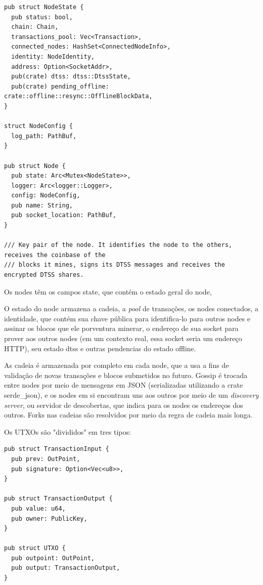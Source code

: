 \documentclass[
  12pt,
  a4paper,
  oneside,
  article,
]{abntex2}
\begin{document}

\begin{verbatim}
pub struct NodeState {
  pub status: bool,
  chain: Chain,
  transactions_pool: Vec<Transaction>,
  connected_nodes: HashSet<ConnectedNodeInfo>,
  identity: NodeIdentity,
  address: Option<SocketAddr>,
  pub(crate) dtss: dtss::DtssState,
  pub(crate) pending_offline: crate::offline::resync::OfflineBlockData,
}

struct NodeConfig {
  log_path: PathBuf,
}

pub struct Node {
  pub state: Arc<Mutex<NodeState>>,
  logger: Arc<logger::Logger>,
  config: NodeConfig,
  pub name: String,
  pub socket_location: PathBuf,
}

/// Key pair of the node. It identifies the node to the others, receives the coinbase of the
/// blocks it mines, signs its DTSS messages and receives the encrypted DTSS shares.
\end{verbatim}

Os nodes têm os campos state, que contém o estado geral do node,

O estado do node armazena a cadeia, a \textit{pool} de transações, os nodes conectados, a identidade, que contém sua chave pública para identifica-lo para outros nodes e assinar os blocos que ele porventura minerar, o endereço de sua socket para prover aos outros nodes (em um contexto real, essa socket seria um endereço HTTP), seu estado dtss e outras pendencias do estado offline.

As cadeia é armazenada por completo em cada node, que a usa a fins de validação de novas transações e blocos submetidos no futuro. Gossip é trocada entre nodes por meio de mensagens em JSON (serializadas utilizando a crate serde\_json), e os nodes em si encontram uns aos outros por meio de um \textit{discovery server}, ou servidor de descobertas, que indica para os nodes os endereços dos outros. Forks nas cadeias são resolvidos por meio da regra de cadeia mais longa.


Os UTXOs são "divididos" em tres tipos:

\begin{verbatim}
pub struct TransactionInput {
  pub prev: OutPoint,
  pub signature: Option<Vec<u8>>,
}

pub struct TransactionOutput {
  pub value: u64,
  pub owner: PublicKey,
}

pub struct UTXO {
  pub outpoint: OutPoint,
  pub output: TransactionOutput,
}
\end{verbatim}
\end{document}
